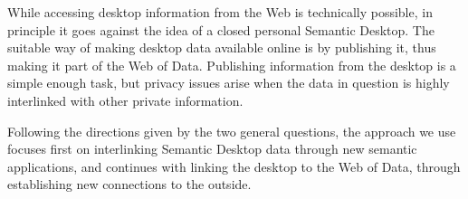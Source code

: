 While accessing desktop information from the Web is technically possible, in principle it goes against the idea of a closed personal Semantic Desktop. The suitable way of making desktop data available online is by publishing it, thus making it part of the Web of Data. 
Publishing information from the desktop is a simple enough task, but privacy issues arise when the data in question is highly interlinked with other private information.

Following the directions given by the two general questions, the approach we use focuses first on interlinking Semantic Desktop data through new semantic applications, and continues with linking the desktop to the Web of Data, through establishing new connections to the outside.
